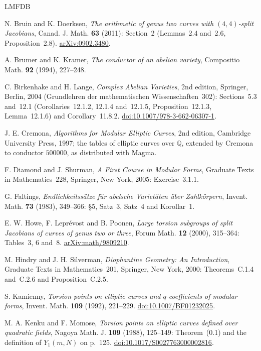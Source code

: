 \documentclass[11pt]{article}
\newcommand{\Q}{\mathbb Q}
\begin{document}
\begin{thebibliography}{LMFDB}

N. Bruin and K. Doerksen, \emph{The arithmetic of genus two curves with \((4,4)\)-split Jacobians}, Canad. J.
Math. \textbf{63} (2011): Section~2 (Lemmas~2.4 and~2.6, Proposition~2.8).
\href{https://arxiv.org/abs/0902.3480}{arXiv:0902.3480}.

A. Brumer and K. Kramer, \emph{The conductor of an abelian variety}, Compositio Math. \textbf{92} (1994),
227--248.

C. Birkenhake and H. Lange, \emph{Complex Abelian Varieties}, 2nd edition, Springer, Berlin, 2004 (Grundlehren der
mathematischen Wissenschaften~302): Sections~5.3 and~12.1 (Corollaries~12.1.2, 12.1.4 and~12.1.5,
Proposition~12.1.3, Lemma~12.1.6) and Corollary~11.8.2.
\href{https://doi.org/10.1007/978-3-662-06307-1}{doi:10.1007/978-3-662-06307-1}.

J. E. Cremona, \emph{Algorithms for Modular Elliptic Curves}, 2nd edition, Cambridge University Press, 1997; the
tables of elliptic curves over \(\Q\), extended by Cremona to conductor \(500000\), as distributed with Magma.

F. Diamond and J. Shurman, \emph{A First Course in Modular Forms}, Graduate Texts in Mathematics~228, Springer, New
York, 2005: Exercise~3.1.1.

G. Faltings, \emph{Endlichkeitss\"atze f\"ur abelsche Variet\"aten \"uber Zahlk\"orpern}, Invent. Math.
\textbf{73} (1983), 349--366: \S5, Satz~3, Satz~4 and Korollar~1.

E. W. Howe, F. Lepr\'evost and B. Poonen, \emph{Large torsion subgroups of split Jacobians of curves of genus two or
three}, Forum Math. \textbf{12} (2000), 315--364: Tables~3, 6 and~8.
\href{https://arxiv.org/abs/math/9809210}{arXiv:math/9809210}.

M. Hindry and J. H. Silverman, \emph{Diophantine Geometry: An Introduction}, Graduate Texts in Mathematics~201,
Springer, New York, 2000: Theorems~C.1.4 and~C.2.6 and Proposition~C.2.5.

S. Kamienny, \emph{Torsion points on elliptic curves and \(q\)-coefficients of modular forms}, Invent. Math.
\textbf{109} (1992), 221--229.
\href{https://doi.org/10.1007/BF01232025}{doi:10.1007/BF01232025}.

M. A. Kenku and F. Momose, \emph{Torsion points on elliptic curves defined over quadratic fields}, Nagoya Math. J.
\textbf{109} (1988), 125--149: Theorem~(0.1) and the definition of \(Y_1(m,N)\) on p.~125.
\href{https://doi.org/10.1017/S0027763000002816}{doi:10.1017/S0027763000002816}.


\end{thebibliography}
\end{document}
